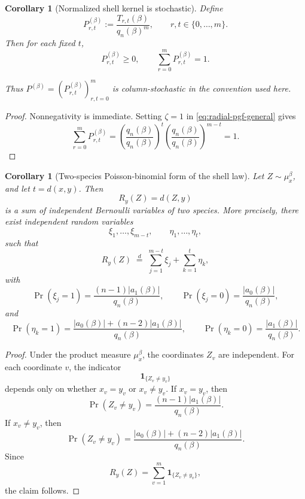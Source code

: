 \documentclass[a4paper,onecolumn,11pt,unpublished]{quantumarticle}
\newtheorem{corollary}[theorem]{Corollary}
\theoremstyle{remark}
\begin{document}
\begin{corollary}[Normalized shell kernel is stochastic]
\label{cor:normalized-shell-kernel-stochastic}
Define
\[
P_{r,t}^{(\beta)}
:=
\frac{T_{r,t}(\beta)}{q_n(\beta)^m},
\qquad r,t\in\{0,\dots,m\}.
\]
Then for each fixed \(t\),
\[
P_{r,t}^{(\beta)}\ge 0,
\qquad
\sum_{r=0}^{m} P_{r,t}^{(\beta)}=1.
\]

Thus \(P^{(\beta)}=(P_{r,t}^{(\beta)})_{r,t=0}^{m}\) is column-stochastic
in the convention used here.
\end{corollary}

\begin{proof}
Nonnegativity is immediate. Setting \(\zeta=1\) in
\eqref{eq:radial-pgf-general} gives
\[
\sum_{r=0}^{m} P_{r,t}^{(\beta)}
=
\left(\frac{q_n(\beta)}{q_n(\beta)}\right)^t
\left(\frac{q_n(\beta)}{q_n(\beta)}\right)^{m-t}
=
1.
\]
\end{proof}


\begin{corollary}[Two-species Poisson-binomial form of the shell law]
\label{cor:two-species-poisson-binomial}
Let \(Z\sim\mu_x^\beta\), and let \(t=d(x,y)\). Then
\[
R_y(Z)=d(Z,y)
\]
is a sum of independent Bernoulli variables of two species. More precisely,
there exist independent random variables
\[
\xi_1,\dots,\xi_{m-t},
\qquad
\eta_1,\dots,\eta_t,
\]
such that
\[
R_y(Z)
\;\stackrel{d}{=}\;
\sum_{j=1}^{m-t}\xi_j+\sum_{k=1}^{t}\eta_k,
\]
with
\[
\Pr(\xi_j=1)
=
\frac{(n-1)|a_1(\beta)|}{q_n(\beta)},
\qquad
\Pr(\xi_j=0)
=
\frac{|a_0(\beta)|}{q_n(\beta)},
\]
and
\[
\Pr(\eta_k=1)
=
\frac{|a_0(\beta)|+(n-2)|a_1(\beta)|}{q_n(\beta)},
\qquad
\Pr(\eta_k=0)
=
\frac{|a_1(\beta)|}{q_n(\beta)}.
\]
\end{corollary}

\begin{proof}
Under the product measure \(\mu_x^\beta\), the coordinates \(Z_v\) are
independent. For each coordinate \(v\), the indicator
\[
\mathbf 1_{\{Z_v\neq y_v\}}
\]
depends only on whether \(x_v=y_v\) or \(x_v\neq y_v\). If \(x_v=y_v\), then
\[
\Pr(Z_v\neq y_v)
=
\frac{(n-1)|a_1(\beta)|}{q_n(\beta)}.
\]
If \(x_v\neq y_v\), then
\[
\Pr(Z_v\neq y_v)
=
\frac{|a_0(\beta)|+(n-2)|a_1(\beta)|}{q_n(\beta)}.
\]
Since
\[
R_y(Z)=\sum_{v=1}^{m}\mathbf 1_{\{Z_v\neq y_v\}},
\]
the claim follows.
\end{proof}
\end{document}
